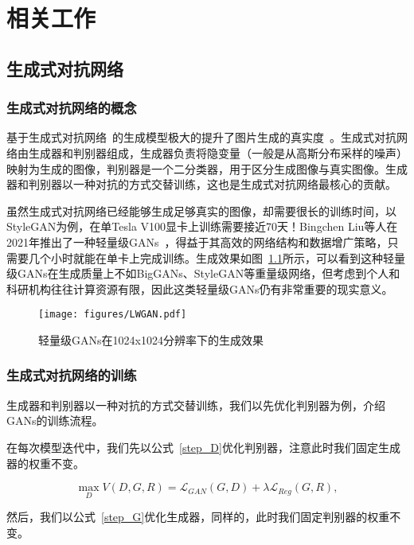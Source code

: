 \chapter{相关工作}

\section{生成式对抗网络}

\subsection{生成式对抗网络的概念}

基于生成式对抗网络~\cite{GANs}的生成模型极大的提升了图片生成的真实度~\cite{BigGANs,stylegan}。生成式对抗网络由生成器和判别器组成，生成器负责将隐变量（一般是从高斯分布采样的噪声）映射为生成的图像，判别器是一个二分类器，用于区分生成图像与真实图像。生成器和判别器以一种对抗的方式交替训练，这也是生成式对抗网络最核心的贡献。

虽然生成式对抗网络已经能够生成足够真实的图像，却需要很长的训练时间，以StyleGAN为例，在单Tesla V100显卡上训练需要接近70天！Bingchen Liu等人在2021年推出了一种轻量级GANs~\cite{lwgan}，得益于其高效的网络结构和数据增广策略，只需要几个小时就能在单卡上完成训练。生成效果如图~\ref{fig:LWGAN}所示，可以看到这种轻量级GANs在生成质量上不如BigGANs、StyleGAN等重量级网络，但考虑到个人和科研机构往往计算资源有限，因此这类轻量级GANs仍有非常重要的现实意义。

\begin{figure}
    \centering
    \texttt{[image: figures/LWGAN.pdf]}
    \caption{轻量级GANs在1024x1024分辨率下的生成效果}
    \label{fig:LWGAN}
\end{figure}

\subsection{生成式对抗网络的训练}

生成器和判别器以一种对抗的方式交替训练，我们以先优化判别器为例，介绍GANs的训练流程。

在每次模型迭代中，我们先以公式~\ref{step_D}优化判别器，注意此时我们固定生成器的权重不变。

\begin{equation}
    \max _{D} V(D, G, R) = \mathcal{L}_{GAN}(G, D) + \lambda \mathcal{L}_{Reg}(G, R),
    \label{step_D}
\end{equation}

然后，我们以公式~\ref{step_G}优化生成器，同样的，此时我们固定判别器的权重不变。

